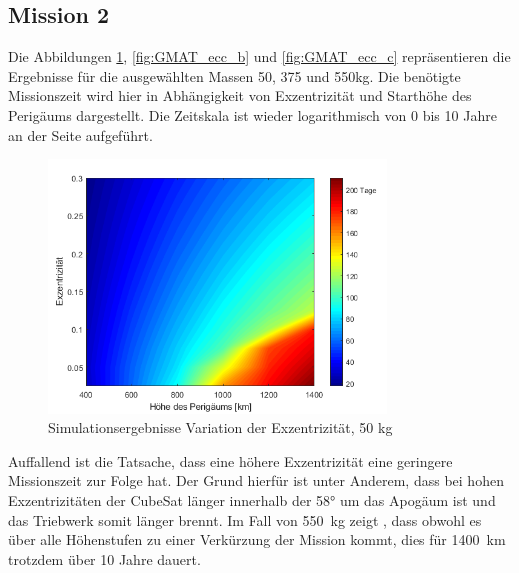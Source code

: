 \subsection{Mission 2}

	Die Abbildungen \ref{fig:GMAT_ecc_a}, \ref{fig:GMAT_ecc_b} und \ref{fig:GMAT_ecc_c} repräsentieren die Ergebnisse für die ausgewählten Massen \num{50}, \num{375} und \num{550}\si{\kilogram}. Die benötigte Missionszeit wird hier in Abhängigkeit von Exzentrizität und Starthöhe des Perigäums dargestellt. Die Zeitskala ist wieder logarithmisch von \num{0} bis \num{10} Jahre an der Seite aufgeführt.


\begin{figure}[h]
	\centering
		\includegraphics[width=0.80\textwidth]{./graphics/GMAT/ecc_perigee_50kg.png}
		\caption{Simulationsergebnisse Variation der Exzentrizität, 50 kg}
	\label{fig:GMAT_ecc_a}
\end{figure}

	Auffallend ist die Tatsache, dass eine höhere Exzentrizität eine geringere Missionszeit zur Folge hat. Der Grund hierfür ist unter Anderem, dass bei hohen Exzentrizitäten der CubeSat länger innerhalb der \num{58}° um das Apogäum ist und das Triebwerk somit länger brennt. Im Fall von \SI{550}{\kilogram} zeigt , dass obwohl es über alle Höhenstufen zu einer Verkürzung der Mission kommt, dies für \SI{1400}{\kilo\metre} trotzdem über \num{10} Jahre dauert. 
	
